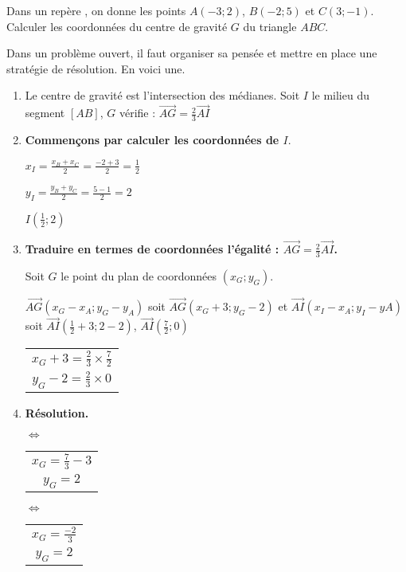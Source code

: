 
Dans un repère \Oij, on donne les points $A(-3;2)$, $B(-2;5)$ et $C(3;-1)$.
Calculer les coordonnées du centre de gravité $G$ du triangle $ABC$. 

\vspace{0.5cm}
Dans un problème ouvert, il faut organiser sa pensée et mettre en place une stratégie de résolution. En voici une.
\vspace{0.5cm}

\begin{enumerate}
\item Le centre de gravité est l'intersection des médianes. Soit $I$ le milieu du segment $[AB]$, $G$ vérifie : $\overrightarrow{AG} = \frac{2}{3}\overrightarrow{AI}$

\item \textbf{Commençons par calculer les coordonnées de $I$}. 

$x_I =  \frac{x_B+x_C}{2} = \frac{-2+3}{2}= \frac{1}{2}$ 

$y_I =  \frac{y_B+y_C}{2}= \frac{5-1}{2}= 2$


$I \left(\frac{1}{2} ; 2 \right)$ 

\item \textbf{Traduire en termes de coordonnées l'égalité : $\overrightarrow{AG} = \frac{2}{3}\overrightarrow{AI}$.}


Soit $G$ le point du plan de coordonnées $(x_G;y_G)$.


$\overrightarrow{AG}(x_G-x_A;y_G-y_A)$ soit $\overrightarrow{AG}(x_G+3;y_G-2)$  et $\overrightarrow{AI}(x_I-x_A;y_I-yA)$ soit  $\overrightarrow{AI}\left(\frac{1}{2}+3;2-2 \right)$, $\overrightarrow{AI}\left(\frac{7}{2};0\right)$

\begin{tabular}{c}
$x_G+3 = \frac{2}{3} \times \frac{7}{2} $\\ 
$y_G-2 = \frac{2}{3} \times 0 $ \\ 
\end{tabular} 

 
\item \textbf{Résolution.}


$\Longleftrightarrow$
\begin{tabular}{c}
$x_G  = \frac{7}{3} -3$\\ 
$y_G = 2$ \\ 
\end{tabular} 
$\Longleftrightarrow$
\begin{tabular}{c}
$x_G  = \frac{-2}{3}$\\ 
$y_G = 2$ \\ 
\end{tabular}



\end{enumerate}
